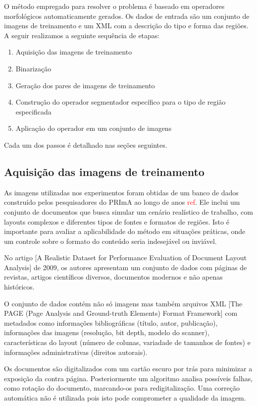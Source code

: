 \documentclass[a4paper,11pt]{article}
\newcommand{\TODO}[1]{\textcolor{red}{#1}}
\begin{document}
O método empregado para resolver o problema é baseado em operadores morfológicos automaticamente gerados. Os dados de entrada são um conjunto de imagens de treinamento e um XML com a descrição do tipo e forma das regiões. A seguir realizamos a seguinte sequência de etapas: 

    \begin{enumerate}
      \item Aquisição das imagens de treinamento
      \item Binarização
      \item Geração dos pares de imagens de treinamento
      \item Construção do operador segmentador específico para o tipo de região especificada
      \item Aplicação do operador em um conjunto de imagens
    \end{enumerate}

    Cada um dos passos é detalhado nas seções seguintes.

    \subsection{Aquisição das imagens de treinamento}

      As imagens utilizadas nos experimentos foram obtidas de um banco de dados construído pelos pesquisadores do PRImA ao longo de anos \TODO{ref}. Ele inclui um conjunto de documentos que busca simular um cenário realístico de trabalho, com layouts complexos e diferentes tipos de fontes e formatos de regiões. Isto é importante para avaliar a aplicabilidade do método em situações práticas, onde um controle sobre o formato do conteúdo seria indesejável ou inviável.

      No artigo [A Realistic Dataset for Performance Evaluation of Document Layout Analysis] de 2009, os autores apresentam um conjunto de dados com páginas de revistas, artigos científicos diversos, documentos modernos e não apenas históricos.

      O conjunto de dados contém não só imagens mas também arquivos XML [The PAGE (Page Analysis and Ground-truth Elements) Format Framework] com metadados como informações bibliográficas (título, autor, publicação), informações das imagens (resolução, bit depth, modelo do scanner), características do layout (número de colunas, variadade de tamanhos de fontes) e informações administrativas (direitos autorais).

      Os documentos são digitalizados com um cartão escuro por trás para minimizar a exposição da contra página. Posteriormente um algoritmo analisa possíveis falhas, como rotação do documento, marcando-os para redigitalização. Uma correção automática não é utilizada pois isto pode comprometer a qualidade da imagem.
\end{document}

